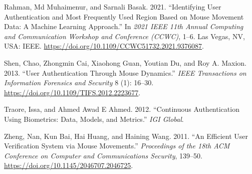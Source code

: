 \documentclass[
  11pt,
  a4paper,
]{article}
\newlength{\cslhangindent}
\newenvironment{CSLReferences}[2] %
 {\begin{list}{}{%
  \setlength{\itemindent}{0pt}
  \setlength{\leftmargin}{0pt}
  \setlength{\parsep}{0pt}
  \ifodd #1
   \setlength{\leftmargin}{\cslhangindent}
   \setlength{\itemindent}{-1\cslhangindent}
  \fi
  \setlength{\itemsep}{#2\baselineskip}}}
 {\end{list}}
\begin{document}
\begin{CSLReferences}{1}{0}
Rahman, Md Muhaimenur, and Sarnali Basak. 2021. {``Identifying User
Authentication and Most Frequently Used Region Based on Mouse Movement
Data: A Machine Learning Approach.''} In \emph{2021 IEEE 11th Annual
Computing and Communication Workshop and Conference (CCWC)}, 1--6. Las
Vegas, NV, USA: IEEE.
\url{https://doi.org/10.1109/CCWC51732.2021.9376087}.

Shen, Chao, Zhongmin Cai, Xiaohong Guan, Youtian Du, and Roy A. Maxion.
2013. {``User Authentication Through Mouse Dynamics.''} \emph{IEEE
Transactions on Information Forensics and Security} 8 (1): 16--30.
\url{https://doi.org/10.1109/TIFS.2012.2223677}.

Traore, Issa, and Ahmed Awad E Ahmed. 2012. {``Continuous Authentication
Using Biometrics: Data, Models, and Metrics.''} \emph{IGI Global}.

Zheng, Nan, Kun Bai, Hai Huang, and Haining Wang. 2011. {``An Efficient
User Verification System via Mouse Movements.''} \emph{Proceedings of
the 18th ACM Conference on Computer and Communications Security},
139--50. \url{https://doi.org/10.1145/2046707.2046725}.

\end{CSLReferences}
\end{document}
